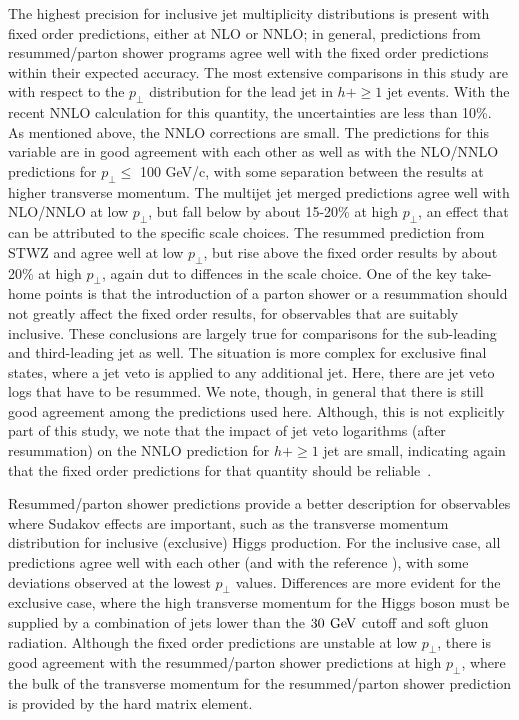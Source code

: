The highest precision for inclusive jet multiplicity distributions is 
present with fixed order predictions, either at NLO or NNLO; in general, 
predictions from resummed/parton shower programs agree well with the 
fixed order predictions within their expected accuracy. The most 
extensive comparisons in this study are with respect to the $p_\perp$ 
distribution for the lead jet in $h+\ge1$ jet events. With the recent 
NNLO calculation for this quantity, the uncertainties are less than 10\%. 
As mentioned above, the NNLO corrections are small. The \hjetscompNNLOPS 
predictions for this variable are in good agreement with each other 
as well as with the NLO/NNLO predictions for $p_\perp \le$ 100 GeV/c, with 
some separation between the \hjetscompNNLOPS results at higher transverse momentum. 
The multijet jet merged predictions agree well with NLO/NNLO at low $p_\perp$, 
but fall below by about 15-20\% at high $p_\perp$, an effect that can be attributed 
to the specific scale choices. The resummed prediction from STWZ and \hjetscompResbos 
agree well at low $p_\perp$, but rise above the fixed order results 
by about 20\% at high $p_\perp$, again dut to diffences in the scale choice. 
One of the key take-home points is that 
the introduction of a parton shower or a resummation should not greatly 
affect the fixed order results, for observables that are suitably 
inclusive. These conclusions are largely true for comparisons for the 
sub-leading and third-leading jet as well. The situation is more complex 
for exclusive final states, where a jet veto is applied to any additional 
jet. Here, there are jet veto logs that have to be resummed. We note, 
though, in general that there is still good agreement among the 
predictions used here. Although, this is not explicitly part of this 
study, we note that the impact of jet veto logarithms (after resummation) 
on the NNLO prediction for $h+\ge1$ jet are small, indicating again that 
the fixed order predictions for that quantity should be 
reliable~\cite{Banfi:2012jm,Banfi:2015pju}.

Resummed/parton shower predictions provide a better description for 
observables where Sudakov effects are important, such as the transverse 
momentum distribution for inclusive (exclusive) Higgs production. For 
the inclusive case, all predictions agree well with each other (and with 
the reference \hjetscompHqT), with some deviations observed at the lowest $p_\perp$ 
values. Differences are more evident for the exclusive case, where the 
high transverse momentum for the Higgs boson must be supplied by a combination of 
jets lower than the $30\,\text{\:GeV}$ cutoff and soft gluon radiation. Although 
the fixed order predictions are unstable at low $p_\perp$, there is good 
agreement with the resummed/parton shower predictions at high $p_\perp$, 
where the bulk of the transverse momentum for the resummed/parton shower 
prediction is provided by the hard matrix element. 

